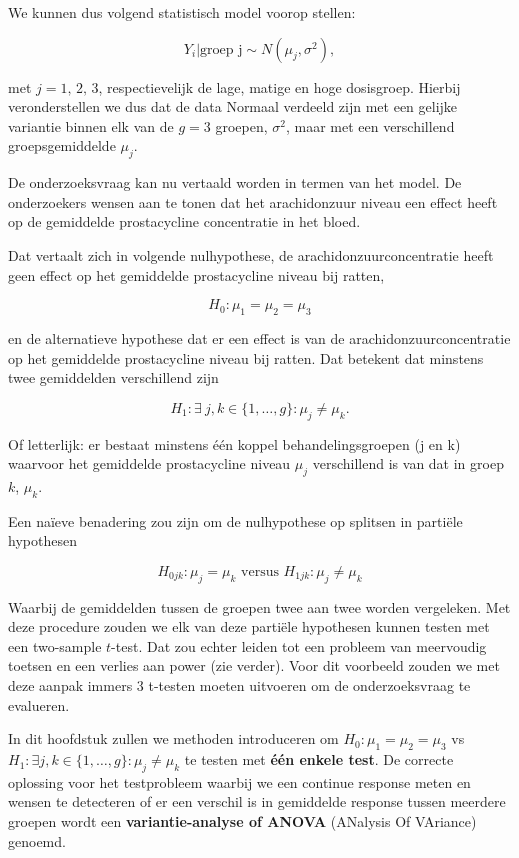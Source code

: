\documentclass[
  12pt,dutch,coursenotes]{book}
\theoremstyle{definition}
\theoremstyle{definition}
\theoremstyle{definition}
\theoremstyle{definition}
\theoremstyle{remark}
\begin{document}
We kunnen dus volgend statistisch model voorop stellen:

\[Y_i \vert \text{groep j} \sim N(\mu_j,\sigma^2),\]

met \(j= \text{1, 2, 3}\), respectievelijk de lage, matige en hoge dosisgroep. Hierbij veronderstellen we dus dat de data Normaal verdeeld zijn met een gelijke variantie binnen elk van de \(g=3\) groepen, \(\sigma^2\), maar met een verschillend groepsgemiddelde \(\mu_j\).

De onderzoeksvraag kan nu vertaald worden in termen van het model.
De onderzoekers wensen aan te tonen dat het arachidonzuur niveau een effect heeft op de gemiddelde prostacycline concentratie in het bloed.

Dat vertaalt zich in volgende nulhypothese, de arachidonzuurconcentratie heeft geen effect op het gemiddelde prostacycline niveau bij ratten,

\[H_0:\mu_1=\mu_2 = \mu_3\]

en de alternatieve hypothese dat er een effect is van de arachidonzuurconcentratie op het gemiddelde prostacycline niveau bij ratten. Dat betekent dat minstens twee gemiddelden verschillend zijn

\[H_1: \exists\ j,k \in \{1,\ldots,g\} : \mu_j\neq\mu_k.\]

Of letterlijk: er bestaat minstens één koppel behandelingsgroepen (j en k) waarvoor het gemiddelde prostacycline niveau \(\mu_j\) verschillend is van dat in groep \(k\), \(\mu_k\).

Een naïeve benadering zou zijn om de nulhypothese op splitsen in partiële hypothesen

\[H_{0jk}: \mu_j=\mu_k \text{ versus } H_{1jk}: \mu_j \neq \mu_k\]

Waarbij de gemiddelden tussen de groepen twee aan twee worden vergeleken.
Met deze procedure zouden we elk van deze partiële hypothesen kunnen testen met een two-sample \(t\)-test.
Dat zou echter leiden tot een probleem van meervoudig toetsen en een verlies aan power (zie verder).
Voor dit voorbeeld zouden we met deze aanpak immers 3 t-testen moeten uitvoeren om de onderzoeksvraag te evalueren.

In dit hoofdstuk zullen we methoden introduceren om \(H_0:\mu_1=\mu_2=\mu_3\) vs \(H_1: \exists j,k \in \{1,\ldots,g\} : \mu_j\neq\mu_k\) te testen met \textbf{één enkele test}.
De correcte oplossing voor het testprobleem waarbij we een continue response meten en wensen te detecteren of er een verschil is in gemiddelde response tussen meerdere groepen wordt een \textbf{variantie-analyse of ANOVA} (ANalysis Of VAriance) genoemd.
\end{document}
